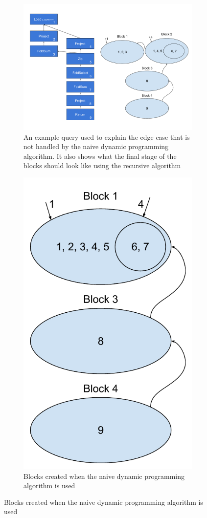\begin{figure}
    \centering
    \begin{subfigure}{\textwidth}
        \includegraphics[width=\textwidth]{appendix/DPEdgeCase.pdf}
        \caption{An example query used to explain the edge case that is not handled by the naive dynamic programming algorithm. It also shows what the final stage of the blocks should look like using the recursive algorithm}
        \label{fig:dpedgeCase}
    \end{subfigure}
    \begin{subfigure}{0.6\textwidth}
        \centering
        \includegraphics[width=0.5\linewidth]{appendix/DPNaive.pdf}
        \caption{Blocks created when the naive dynamic programming algorithm is used}
        \label{fig:dpedgeCaseNaive}
    \end{subfigure}
\end{figure}

